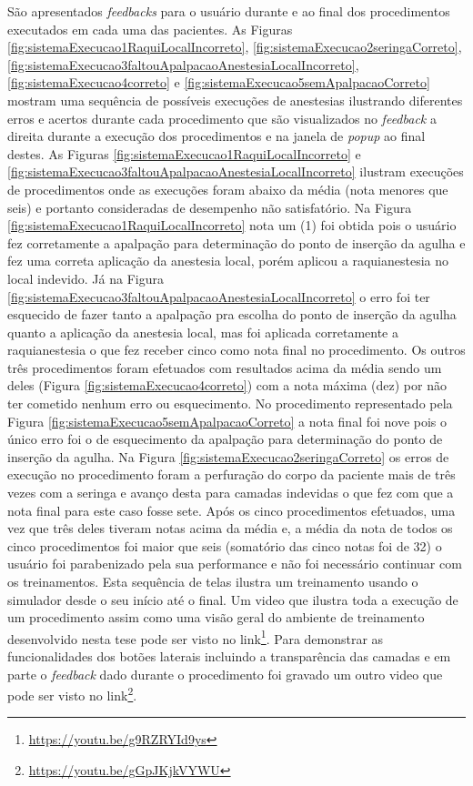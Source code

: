 São apresentados \textit{feedbacks} para o usuário durante e ao final dos procedimentos executados em cada uma das pacientes. As Figuras \ref{fig:sistemaExecucao1RaquiLocalIncorreto}, \ref{fig:sistemaExecucao2seringaCorreto}, \ref{fig:sistemaExecucao3faltouApalpacaoAnestesiaLocalIncorreto}, \ref{fig:sistemaExecucao4correto} e \ref{fig:sistemaExecucao5semApalpacaoCorreto} mostram uma sequência de possíveis execuções de anestesias ilustrando diferentes erros e acertos durante cada procedimento que são visualizados no \textit{feedback} a direita durante a execução dos procedimentos e na janela de \textit{popup} ao final destes. As Figuras \ref{fig:sistemaExecucao1RaquiLocalIncorreto} e \ref{fig:sistemaExecucao3faltouApalpacaoAnestesiaLocalIncorreto} ilustram execuções de procedimentos onde as execuções foram abaixo da média (nota menores que seis) e portanto consideradas de desempenho não satisfatório. Na Figura \ref{fig:sistemaExecucao1RaquiLocalIncorreto}  nota um (1) foi obtida pois o usuário fez corretamente a apalpação para determinação do ponto de inserção da agulha e fez uma correta aplicação da anestesia local, porém aplicou a raquianestesia no local indevido. Já na Figura \ref{fig:sistemaExecucao3faltouApalpacaoAnestesiaLocalIncorreto} o erro foi ter esquecido de fazer tanto a apalpação pra escolha do ponto de inserção da agulha quanto a aplicação da anestesia local, mas foi aplicada corretamente a raquianestesia o que fez receber cinco como nota final no procedimento. Os outros três procedimentos foram efetuados com resultados acima da média sendo um deles (Figura \ref{fig:sistemaExecucao4correto}) com a nota máxima (dez) por não ter cometido nenhum erro ou esquecimento. No procedimento representado pela Figura \ref{fig:sistemaExecucao5semApalpacaoCorreto} a nota final foi nove pois o único erro foi o de esquecimento da apalpação para determinação do ponto de inserção da agulha. Na Figura \ref{fig:sistemaExecucao2seringaCorreto} os erros de execução no procedimento foram a perfuração do corpo da paciente mais de três vezes com a seringa e avanço desta para camadas indevidas o que fez com que a nota final para este caso fosse sete. 
Após os cinco procedimentos efetuados, uma vez que três deles tiveram notas acima da média e, a média da nota de todos os cinco procedimentos foi maior que seis (somatório das cinco notas foi de 32) o usuário foi parabenizado pela sua performance e não foi necessário continuar com os treinamentos. Esta sequência de telas ilustra um treinamento usando o simulador desde o seu início até o final. Um video que ilustra toda a execução de um procedimento assim como uma visão geral do ambiente de treinamento desenvolvido nesta tese pode ser visto no link\footnote{\url{https://youtu.be/g9RZRYId9ys}}. Para demonstrar as funcionalidades dos botões laterais incluindo a transparência das camadas e em parte o \textit{feedback} dado durante o procedimento foi gravado um outro video que pode ser visto no link\footnote{\url{https://youtu.be/gGpJKjkVYWU}}.

